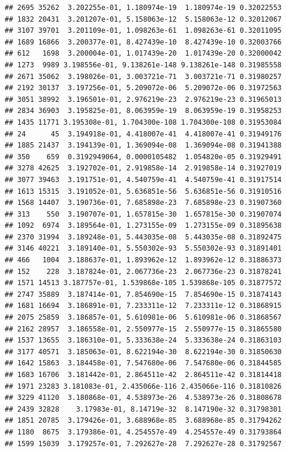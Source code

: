 \documentclass[
]{article}
\begin{document}
\begin{verbatim}
## 2695 35262  3.202255e-01, 1.180974e-19  1.180974e-19 0.32022553
## 1832 20431  3.201207e-01, 5.158063e-12  5.158063e-12 0.32012067
## 3107 39701  3.201109e-01, 1.098263e-61  1.098263e-61 0.32011095
## 1689 16866  3.200377e-01, 8.427439e-10  8.427439e-10 0.32003766
## 612   1698  3.200004e-01, 1.017439e-20  1.017439e-20 0.32000042
## 1273  9989 3.198556e-01, 9.138261e-148 9.138261e-148 0.31985558
## 2671 35062  3.198026e-01, 3.003721e-71  3.003721e-71 0.31980257
## 2192 30137  3.197256e-01, 5.209072e-06  5.209072e-06 0.31972563
## 3051 38992  3.196501e-01, 2.976219e-23  2.976219e-23 0.31965013
## 2834 36903  3.195825e-01, 8.063959e-19  8.063959e-19 0.31958253
## 1435 11771 3.195308e-01, 1.704300e-108 1.704300e-108 0.31953084
## 24      45  3.194918e-01, 4.418007e-41  4.418007e-41 0.31949176
## 1885 21437  3.194139e-01, 1.369094e-08  1.369094e-08 0.31941388
## 350    659  0.3192949064, 0.0000105482  1.054820e-05 0.31929491
## 3278 42625  3.192702e-01, 2.919858e-14  2.919858e-14 0.31927019
## 3077 39463  3.191751e-01, 4.540759e-41  4.540759e-41 0.31917514
## 1613 15315  3.191052e-01, 5.636851e-56  5.636851e-56 0.31910516
## 1568 14407  3.190736e-01, 7.685898e-23  7.685898e-23 0.31907360
## 313    550  3.190707e-01, 1.657815e-30  1.657815e-30 0.31907074
## 1092  6974  3.189564e-01, 1.273155e-09  1.273155e-09 0.31895638
## 2370 31994  3.189248e-01, 5.443035e-08  5.443035e-08 0.31892475
## 3146 40221  3.189140e-01, 5.550302e-93  5.550302e-93 0.31891401
## 466   1004  3.188637e-01, 1.893962e-12  1.893962e-12 0.31886373
## 152    228  3.187824e-01, 2.067736e-23  2.067736e-23 0.31878241
## 1571 14513 3.187757e-01, 1.539868e-105 1.539868e-105 0.31877572
## 2747 35889  3.187414e-01, 7.854690e-15  7.854690e-15 0.31874143
## 1681 16694  3.186891e-01, 7.233311e-12  7.233311e-12 0.31868915
## 2075 25859  3.186857e-01, 5.610981e-06  5.610981e-06 0.31868567
## 2162 28957  3.186558e-01, 2.550977e-15  2.550977e-15 0.31865580
## 1537 13655  3.186310e-01, 5.333638e-24  5.333638e-24 0.31863103
## 3177 40571  3.185063e-01, 8.622194e-30  8.622194e-30 0.31850630
## 1642 15863  3.184458e-01, 7.547680e-06  7.547680e-06 0.31844585
## 1683 16706  3.181442e-01, 2.864511e-42  2.864511e-42 0.31814418
## 1971 23283 3.181083e-01, 2.435066e-116 2.435066e-116 0.31810826
## 3229 41120  3.180868e-01, 4.538973e-26  4.538973e-26 0.31808678
## 2439 32828    3.17983e-01, 8.14719e-32  8.147190e-32 0.31798301
## 1851 20785  3.179426e-01, 3.688968e-85  3.688968e-85 0.31794262
## 1180  8675  3.179386e-01, 4.254557e-49  4.254557e-49 0.31793864
## 1599 15039  3.179257e-01, 7.292627e-28  7.292627e-28 0.31792567

\end{verbatim}
\end{document}
